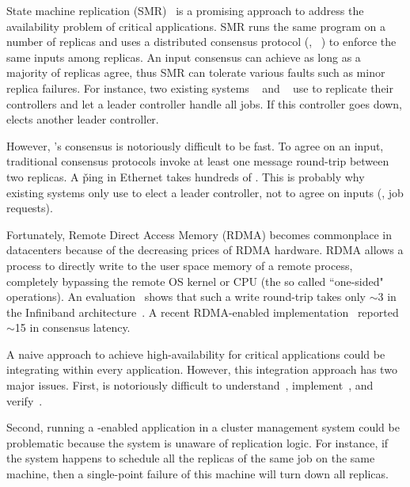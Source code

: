 State machine replication (SMR)~\cite{paxos} is a promising approach 
to address the availability problem of critical applications. SMR runs the 
same program on a number of replicas and uses a distributed consensus protocol 
(\eg, 
\paxos~\cite{paxos:practical,paxos,paxos:simple,paxos:complex,epaxos:sosp13}) 
to enforce the same inputs among 
replicas. An input consensus can achieve as long as a majority of replicas 
agree, thus SMR can tolerate various faults such as minor replica failures. For 
instance, two existing systems \borg~\cite{borg:eurosys15} and 
\mesos~\cite{mesos:nsdi11} use \paxos to replicate their controllers and let a 
leader controller handle all jobs. If this controller goes down, \paxos elects 
another leader controller.



However, \paxos's consensus is notoriously difficult to be fast. 
To agree on an input, traditional consensus protocols invoke at least one 
message round-trip between two replicas. A \v{ping} in Ethernet 
takes hundreds of \us. This is probably why existing 
systems only use \paxos to elect a leader controller, not to agree on inputs 
(\ie, job requests).

Fortunately, Remote Direct Access Memory (RDMA) becomes commonplace in 
datacenters because of the decreasing prices of RDMA hardware. RDMA allows a 
process to directly write to the user space memory of a remote process, 
completely bypassing the remote OS kernel or CPU (the so called ``one-sided" 
operations). An evaluation~\cite{pilaf:usenix14} shows that such a write 
round-trip takes only $\sim$3 \us in the Infiniband 
architecture~\cite{infiniband}. A recent 
RDMA-enabled \paxos implementation~\cite{dare:hpdc15} reported 
$\sim$15 \us in consensus latency.

A naive approach to achieve high-availability for critical applications could 
be integrating \paxos within every application. However, this integration 
approach has two major issues. First, \paxos is notoriously difficult 
to understand~\cite{raft:usenix14}, implement~\cite{paxos:practical}, and 
verify~\cite{demeter:sosp11}.

Second, running a \paxos-enabled application in a 
cluster management system could be problematic because the system is unaware 
of replication logic. For instance, if the system happens to schedule all 
the replicas of the same job on the same machine, then a single-point failure 
of this machine will turn down all replicas. 


